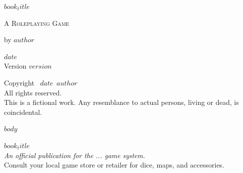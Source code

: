 \documentclass[12pt]{memoir}
\def\booktitle{$book_title$}
\def\bookauthor{$author$}
\def\bookdate{$date$}
\def\bookversion{$version$}
\begin{document}
\thispagestyle{empty}
\begin{center}
\vspace*{1in}
{\Huge\bfseries\booktitle\par}
\vspace{0.5in}
{\Large\scshape A Roleplaying Game\par}
\vspace{1in}
{\Large by \bookauthor\par}
\vfill
{\large\bookdate\\
Version \bookversion}
\end{center}

\clearpage
\thispagestyle{empty}
\vspace*{\fill}
\begin{center}
Copyright \textcopyright\ \bookdate\ \bookauthor\\
All rights reserved.\\
\bigskip
This is a fictional work. Any resemblance to actual persons, living or dead, is coincidental.
\end{center}
\vspace*{\fill}

\clearpage
\tableofcontents

\mainmatter

$body$

\clearpage
\thispagestyle{empty}
\begin{center}
\vspace*{2in}
{\Large\bfseries\booktitle}\\
\vspace{1in}
{\normalsize
\textit{An official publication for the ... game system.}}\\
\vfill
{\small
Consult your local game store or retailer for dice, maps, and accessories.}
\end{center}
\end{document}
